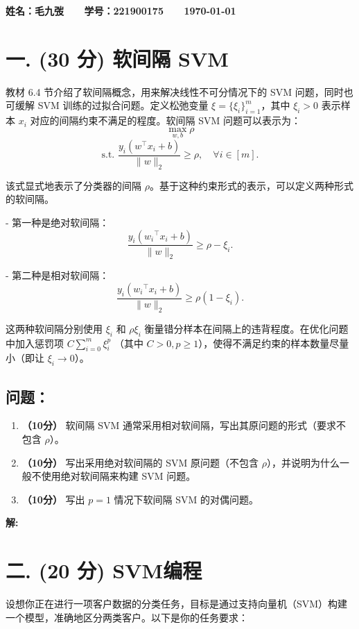 \documentclass[8pt]{article}
\begin{document}
\textbf{\color{blue} \Large 姓名：毛九弢 \ \ \ 学号：221900175 \ \ \ \today}

\section*{一. (30 分) 软间隔 SVM}
教材 6.4 节介绍了软间隔概念，用来解决线性不可分情况下的 SVM 问题，同时也可缓解 SVM 训练的过拟合问题。定义松弛变量 \( \xi = \{\xi_i\}_{i=1}^m \)，其中 \( \xi_i > 0 \) 表示样本 \( x_i \) 对应的间隔约束不满足的程度。软间隔 SVM 问题可以表示为：
\[
\max_{w, b} \rho
\]
\[
\text{s.t. } \frac{y_i (w^\top x_i + b)}{\|w\|_2} \geq \rho, \quad \forall i \in [m].
\]


该式显式地表示了分类器的间隔 \( \rho \)。基于这种约束形式的表示，可以定义两种形式的软间隔。

- 第一种是绝对软间隔：
  \[
  \frac{y_i ({w_i}^\top x_i + b)}{\|w\|_2} \geq \rho - \xi_i.
  \]

- 第二种是相对软间隔：
  \[
  \frac{y_i ({w_i}^\top x_i + b)}{\|w\|_2} \geq \rho(1 - \xi_i).
  \]

这两种软间隔分别使用 \( \xi_i \) 和 \( \rho \xi_i \) 衡量错分样本在间隔上的违背程度。在优化问题中加入惩罚项 \( C \sum_{i=0}^m \xi_i^p \) （其中 \( C > 0, p \geq 1 \)），使得不满足约束的样本数量尽量小（即让 \( \xi_i \to 0 \)）。

\subsection*{问题：}

\begin{enumerate}
    \item \textbf{（10分）} 软间隔 SVM 通常采用相对软间隔，写出其原问题的形式（要求不包含 \( \rho \)）。
    \item \textbf{（10分）} 写出采用绝对软间隔的 SVM 原问题（不包含 \( \rho \)），并说明为什么一般不使用绝对软间隔来构建 SVM 问题。
    \item \textbf{（10分）} 写出 \( p = 1 \) 情况下软间隔 SVM 的对偶问题。
\end{enumerate}


\textbf{\large 解:}

\vspace{3em}

\section*{二. (20 分) SVM编程}
设想你正在进行一项客户数据的分类任务，目标是通过支持向量机（SVM）构建一个模型，准确地区分两类客户。以下是你的任务要求：
\end{document}
